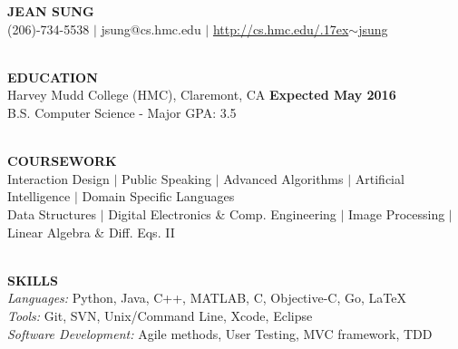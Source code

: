 \documentclass[11.5pt]{article}
\makeatletter
\newcommand{\selfName}{\textbf{\fontsize{30}{30}\selectfont JEAN SUNG }}
\newcommand{\email}{\large {jsung@cs.hmc.edu }}
\newcommand{\phone}{\large (206)-734-5538 }
\newcommand{\tildeText}{\raise.17ex\hbox{$\scriptstyle\sim$}}
\newcommand{\websitedisplaytext}{\large http://cs.hmc.edu/\tildeText jsung }
\newcommand{\website}{\href{http://cs.hmc.edu/~jsung}{\websitedisplaytext}}
\newcommand{\wrapTitle}[1]{{\sectionNL \textbf{\Large #1}} \sectionNL}
\newcommand{\vb}{ $\mid$ }
\newcommand{\sectionNL}{~\\[1pt]}
\newcommand{\HMC}{HMC}
\newcommand{\rightAlign}{\hfill}
\makeatother
\begin{document}
\begin{center}
\selfName\\
\phone  
\vb\email 
\vb\website \\
\hrulefill
\end{center}


\begin{flushleft}
\wrapTitle{EDUCATION}
Harvey Mudd College (\HMC), Claremont, CA \rightAlign \textbf{Expected May 2016 } \\
B.S. Computer Science - Major GPA: 3.5   \\
\end{flushleft}


\begin{flushleft}
\wrapTitle{COURSEWORK}
Interaction Design 
\vb Public Speaking
\vb Advanced Algorithms 
\vb Artificial Intelligence 
\vb Domain Specific Languages \\
Data Structures 
\vb Digital Electronics \& Comp. Engineering
\vb Image Processing  
\vb Linear Algebra \& Diff. Eqs. II



\end{flushleft}


\begin{flushleft}
\wrapTitle{SKILLS}
\textit{Languages:} Python, Java, C++, MATLAB, C, Objective-C, Go, \LaTeX \\
\textit{Tools:} Git, SVN, Unix/Command Line, Xcode, Eclipse \\ %
\textit{Software Development:} Agile methods, User Testing, MVC framework, TDD 

\end{flushleft}
\end{document}
